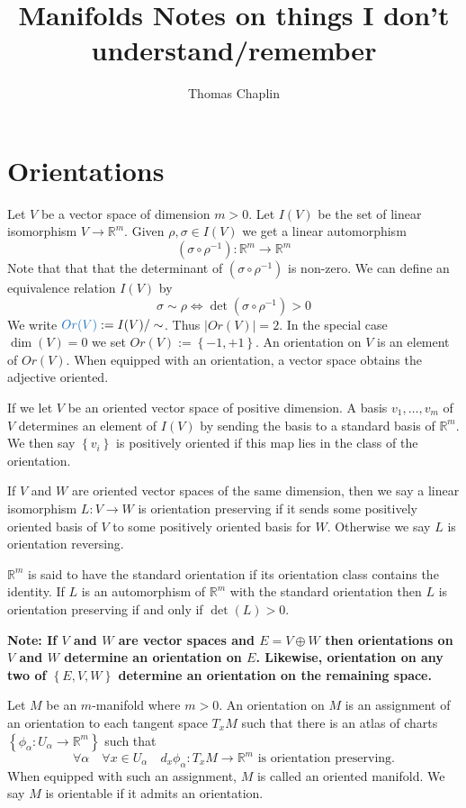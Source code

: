 \documentclass[11pt]{article}
\title{Manifolds Notes on things I don't understand/remember}
\author{Thomas Chaplin}
\date{}
\newcommand{\defeq}{:=}
\newcommand{\abs}[1]{|#1|}
\newcommand{\R}{\mathbb{R}}
\newenvironment{defin}
	{\begin{mdframed}[backgroundcolor=white, roundcorner=5pt, linewidth=1pt, linecolor=RoyalBlue]
		\setlength{\parindent}{0pt}}
	{\end{mdframed}}
\newcommand{\mdf}[1]{{\color{RoyalBlue} #1}}
\newenvironment{note}
	{\begin{mdframed}[backgroundcolor=white, linecolor=RubineRed, roundcorner=5pt, linewidth=1pt]\bfseries{Note:}\normalfont
	\setlength{\parindent}{0pt}}
	{\end{mdframed}}
\begin{document}
\maketitle
\tableofcontents
\newpage

\section{Orientations}
Let $V$ be a vector space of dimension $m> 0$.
Let $I(V)$ be the set of linear isomorphism $V\to \R^m$.
Given $\rho, \sigma \in I(V)$ we get a linear automorphism
\[
	(\sigma \circ \rho^{-1}) : \R^m \to \R^m
\]
Note that that that the determinant of $(\sigma \circ \rho^{-1})$ is non-zero.
We can define an equivalence relation $I(V)$ by
\[
	\sigma \sim \rho \iff \det(\sigma\circ \rho^{-1}) > 0
\]
We write $\mdf{Or(V)}\defeq I(V)/\sim$.
Thus $\abs{Or(V)}=2$.
In the special case $\dim (V) = 0$ we set $Or(V)\defeq \left\{ -1, +1\right\}$.
An \mdf{orientation} on $V$ is an element of $Or(V)$.
When equipped with an orientation, a vector space obtains the adjective \mdf{oriented}.

If we let $V$ be an oriented vector space of positive dimension.
A basis $v_1, \dots , v_m$ of $V$ determines an element of $I(V)$ by sending the basis to a standard basis of $\R^m$.
We then say $\left\{ v_i\right\}$ is \mdf{positively oriented} if this map lies in the class of the orientation.

If $V$ and $W$ are oriented vector spaces of the same dimension, then we say a linear isomorphism $L: V \to W$ is \mdf{orientation preserving} if it sends some positively oriented basis of $V$ to some positively oriented basis for $W$.
Otherwise we say $L$ is \mdf{orientation reversing}.

$\R^m$ is said to have the \mdf{standard orientation} if its orientation class contains the identity.
If $L$ is an automorphism of $\R^m$ with the standard orientation then $L$ is orientation preserving if and only if $\det(L) >0$.

\begin{note}
If $V$ and $W$ are vector spaces and $E= V \oplus W$ then orientations on $V$ and $W$ determine an orientation on $E$.
Likewise, orientation on any two of $\left\{ E, V, W\right\}$ determine an orientation on the remaining space.
\end{note}

\begin{defin}
Let $M$ be an $m$-manifold where $m>0$.
An \mdf{orientation} on $M$ is an assignment of an orientation to each tangent space $T_xM$ such that there is an atlas of charts $\left\{ \phi_\alpha : U_\alpha \to \R^m\right\}$ such that
\[
	\forall \alpha \quad \forall x\in U_\alpha \quad d_x\phi_\alpha:T_xM \to \R^m\text{ is orientation preserving.}
\]
When equipped with such an assignment, $M$ is called an \mdf{oriented manifold}.
We say $M$ is \mdf{orientable} if it admits an orientation.
\end{defin}
\end{document}
